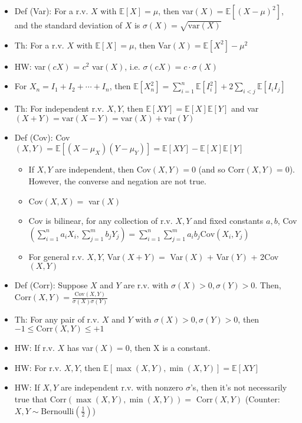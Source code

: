 \documentclass{article}
\begin{document}
{\color{blue} }
\begin{itemize}
	\item Def (Var): For a r.v. $X$ with $\mathbb{E}[X] = \mu$, then var$(X) = \mathbb{E}[(X-\mu)^2]$, and the standard deviation of $X$ is $\sigma(X) = \sqrt{\text{var}(X)}$
	\item Th: For a r.v. $X$ with $\mathbb{E}[X] = \mu$, then Var$(X) = \mathbb{E}[X^2] - \mu^2$
	\item HW: var$(cX)$ = $c^2$ var$(X)$, i.e. $\sigma(cX) = c\cdot\sigma(X)$
	\item For $X_n = I_1 + I_2 + \cdots + I_n$, then
	$\mathbb{E}[X_n^2] = \sum\limits_{i=1}^n \mathbb{E}[I_i^2] + 2\sum\limits_{i<j} \mathbb{E}[I_iI_j]$
	\item Th: For {\color{red} independent} r.v. $X,Y$, then $\mathbb{E}[XY] = \mathbb{E}[X]\mathbb{E}[Y]$ and var$(X+Y) = \text{var}(X-Y) = \text{var}(X) + \text{var}(Y)$
	\item Def (Cov): Cov$(X, Y) = \mathbb{E}[(X-\mu_X)(Y-\mu_Y)] =
	\mathbb{E}[XY] - \mathbb{E}[X]\mathbb{E}[Y]$
	\begin{itemize}
		\item If $X,Y$ are independent, then Cov$(X,Y) = 0$ (and so Corr$(X,Y) = 0$). However, the converse and negation are {\color{red} not} true.
		\item Cov$(X, X) =$ var$(X)$
		\item Cov is bilinear, for any collection of r.v. $X,Y$ and fixed constants $a, b$,
		Cov$(\sum\limits_{i=1}^{n} a_iX_i, \sum\limits_{j=1}^{m} b_jY_j) =
		\sum\limits_{i=1}^{n}\sum\limits_{j=1}^{m} a_ib_j\text{Cov}(X_i, Y_j)$
		\item For general r.v. $X,Y$, Var$(X+Y) =$ Var$(X)$ + Var$(Y)$ + 2Cov$(X, Y)$
	\end{itemize}
	\item Def (Corr): Suppose $X$ and $Y$ are r.v. with $\sigma(X) > 0, \sigma(Y) > 0$. Then, Corr$(X, Y) = \frac{\text{Cov}(X, Y)}{\sigma(X)\sigma(Y)}$
	\item Th: For any pair of r.v. $X$ and $Y$ with $\sigma(X) > 0, \sigma(Y) > 0$, then $-1\leq \text{Corr}(X, Y) \leq +1$
	\item HW: If r.v. $X$ has var$(X) = 0$, then X is a constant.
	\item HW: For r.v. $X,Y$, then $\mathbb{E}[\max(X,Y), \min(X,Y)] = \mathbb{E}[XY]$
	\item HW: If $X,Y$ are independent r.v. with nonzero $\sigma$'s, then it's not necessarily true that Corr$(\max(X,Y), \min(X,Y)) =$ Corr$(X, Y)$ (Counter: $X,Y\sim\text{Bernoulli}(\frac{1}{2})$)

\end{itemize}
\end{document}
